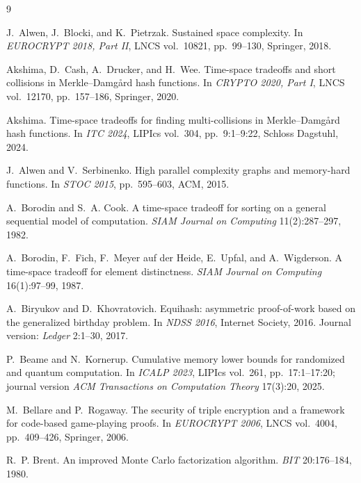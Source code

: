 \documentclass[11pt]{article}
\theoremstyle{plain}
\theoremstyle{definition}
\begin{document}
\begin{thebibliography}{9}
\small

J.~Alwen, J.~Blocki, and K.~Pietrzak.
\newblock Sustained space complexity.
\newblock In \emph{EUROCRYPT 2018, Part II}, LNCS vol.~10821,
  pp.~99--130, Springer, 2018.

Akshima, D.~Cash, A.~Drucker, and H.~Wee.
\newblock Time-space tradeoffs and short collisions in
  Merkle--Damg\aa{}rd hash functions.
\newblock In \emph{CRYPTO 2020, Part I}, LNCS vol.~12170, pp.~157--186,
  Springer, 2020.

Akshima.
\newblock Time-space tradeoffs for finding multi-collisions in
  Merkle--Damg\aa{}rd hash functions.
\newblock In \emph{ITC 2024}, LIPIcs vol.~304, pp.~9:1--9:22, Schloss
  Dagstuhl, 2024.

J.~Alwen and V.~Serbinenko.
\newblock High parallel complexity graphs and memory-hard functions.
\newblock In \emph{STOC 2015}, pp.~595--603, ACM, 2015.

A.~Borodin and S.~A. Cook.
\newblock A time-space tradeoff for sorting on a general sequential model
  of computation.
\newblock \emph{SIAM Journal on Computing} 11(2):287--297, 1982.

A.~Borodin, F.~Fich, F.~Meyer auf der Heide, E.~Upfal, and A.~Wigderson.
\newblock A time-space tradeoff for element distinctness.
\newblock \emph{SIAM Journal on Computing} 16(1):97--99, 1987.

A.~Biryukov and D.~Khovratovich.
\newblock Equihash: asymmetric proof-of-work based on the generalized
  birthday problem.
\newblock In \emph{NDSS 2016}, Internet Society, 2016.  Journal version:
  \emph{Ledger} 2:1--30, 2017.

P.~Beame and N.~Kornerup.
\newblock Cumulative memory lower bounds for randomized and quantum
  computation.
\newblock In \emph{ICALP 2023}, LIPIcs vol.~261, pp.~17:1--17:20; journal
  version \emph{ACM Transactions on Computation Theory} 17(3):20, 2025.

M.~Bellare and P.~Rogaway.
\newblock The security of triple encryption and a framework for code-based
  game-playing proofs.
\newblock In \emph{EUROCRYPT 2006}, LNCS vol.~4004, pp.~409--426,
  Springer, 2006.

R.~P. Brent.
\newblock An improved Monte Carlo factorization algorithm.
\newblock \emph{BIT} 20:176--184, 1980.


\end{thebibliography}
\end{document}
